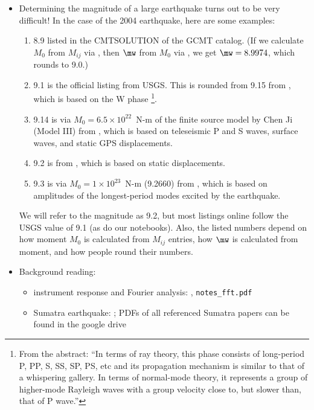 \documentclass[11pt,titlepage,fleqn]{article}
\begin{document}
\begin{itemize}

\item Determining the magnitude of a large earthquake turns out to be very difficult! In the case of the 2004 earthquake, here are some examples:
%
\begin{enumerate}
\item 8.9 listed in the CMTSOLUTION of the GCMT catalog. (If we calculate $M_0$ from $M_{ij}$ via \citet{SilverJordan1982}, then $\mw$ from $M_0$ via \citet{Kanamori1977}, we get $\mw = 8.9974$, which rounds to 9.0.)

\item 9.1 is the official listing from USGS. This is rounded from 9.15 from \citet{Duputel2012Wphase}, which is based on the W phase \citep{Kanamori1993}\footnote{From the abstract: ``In terms of ray theory, this phase consists of long-period P, PP, S, SS, SP, PS, etc and its propagation mechanism is similar to that of a whispering gallery. In terms of normal-mode theory, it represents a group of higher-mode Rayleigh waves with a group velocity close to, but slower than, that of P wave.''}.

\item 9.14 is via $M_0 = 6.5 \times 10^{22}$~N-m of the finite source model by Chen Ji (Model III) from \citet{Ammon2005}, which is based on teleseismic P and S waves, surface waves, and static GPS displacements.

\item 9.2 is from \citet{Banerjee2005}, which is based on static displacements.

\item 9.3 is via $M_0 = 1 \times 10^{23}$~N-m (9.2660) from \citet{SSteinOkal2005}, which is based on amplitudes of the longest-period modes excited by the earthquake.
\end{enumerate}
%
We will refer to the magnitude as 9.2, but most listings online follow the USGS value of 9.1 (as do our notebooks). Also, the listed numbers depend on how moment $M_0$ is calculated from $M_{ij}$ entries, how $\mw$ is calculated from moment, and how people round their numbers.

\item Background reading:

\begin{itemize}
\item instrument response and Fourier analysis: \citet[][Ch.~6]{SteinWysession}, \verb+notes_fft.pdf+
\item Sumatra earthquake: \citep{Lay2005,Ammon2005,Park2005,Ni2005}; PDFs of all referenced Sumatra papers can be found in the google drive
\end{itemize}


\end{itemize}
\end{document}
